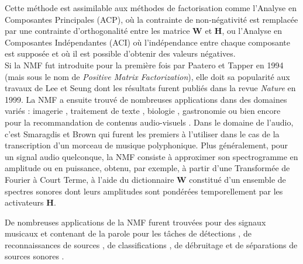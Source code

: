 Cette méthode est assimilable aux méthodes de factorisation comme l'Analyse en Composantes Principales (ACP), où la contrainte de non-négativité est remplacée par une contrainte d'orthogonalité entre les matrice $\mathbf{W}$ et $\mathbf{H}$, ou l'Analyse en Composantes Indépendantes (ACI) où l'indépendance entre chaque composante est supposée et où il est possible d'obtenir des valeurs négatives. \\

Si la NMF fut introduite pour la première fois par Paatero et Tapper \cite{paatero_positive_1994} en 1994 (mais sous le nom de \textit{Positive Matrix Factorization}), elle doit sa popularité aux travaux de Lee et Seung \cite{lee_learning_1999} dont les résultats furent publiés dans la revue \textit{Nature} en 1999. La NMF a ensuite trouvé de nombreuses applications dans des domaines variés : imagerie \cite{guillamet_introducing_2003, monga_robust_2007}, traitement de texte \cite{xu_document_2003, berry_email_2005}, biologie \cite{gao_improving_2005, chen_constrained_nodate}, gastronomie \cite{hawkins_clustering_2006} ou bien encore pour la recommandation de contenus audio-visuels \cite{luo2014efficient}. Dans le domaine de l'audio, c'est Smaragdis et Brown \cite{smaragdis_non-negative_2003} qui furent les premiers à l'utiliser dans le cas de la transcription d'un morceau de musique polyphonique. Plus généralement, pour un signal audio quelconque, la NMF consiste à approximer son spectrogramme en amplitude ou en puissance, obtenu, par exemple, à partir d'une Transformée de Fourier à Court Terme, à l'aide du dictionnaire $\textbf{W}$ constitué d'un ensemble de spectres sonores dont leurs amplitudes sont pondérées temporellement par les activateurs $\textbf{H}$.

De nombreuses applications de la NMF furent trouvées pour des signaux musicaux et contenant de la parole pour les tâches de détections \cite{dessein2013real}, de reconnaissances de sources \cite{gemmeke2013exemplar}, de classifications \cite{benetos2006musical}, de débruitage \cite{wilson_speech_2008} et de séparations de sources sonores \cite{virtanen_monaural_2007}.

%

